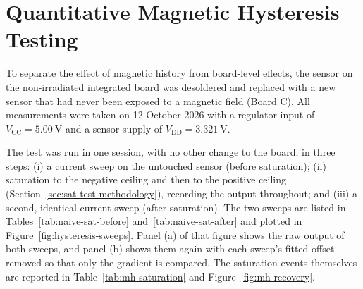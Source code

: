\documentclass[12pt,a4paper]{article}
\begin{document}
\section{Quantitative Magnetic Hysteresis Testing}
\label{sec:hysteresis}

To separate the effect of magnetic history from board-level effects, the sensor on the non-irradiated integrated board was desoldered and replaced with a new sensor that had never been exposed to a magnetic field (Board C). All measurements were taken on 12 October 2026 with a regulator input of $V_{\text{CC}} = \SI{5.00}{\volt}$ and a sensor supply of $V_{\text{DD}} = \SI{3.321}{\volt}$.

The test was run in one session, with no other change to the board, in three steps: (i) a current sweep on the untouched sensor (before saturation); (ii) saturation to the negative ceiling and then to the positive ceiling (Section~\ref{sec:sat-test-methodology}), recording the output throughout; and (iii) a second, identical current sweep (after saturation). The two sweeps are listed in Tables~\ref{tab:naive-sat-before} and~\ref{tab:naive-sat-after} and plotted in Figure~\ref{fig:hysteresis-sweeps}. Panel (a) of that figure shows the raw output of both sweeps, and panel (b) shows them again with each sweep's fitted offset removed so that only the gradient is compared. The saturation events themselves are reported in Table~\ref{tab:mh-saturation} and Figure~\ref{fig:mh-recovery}.
\end{document}
